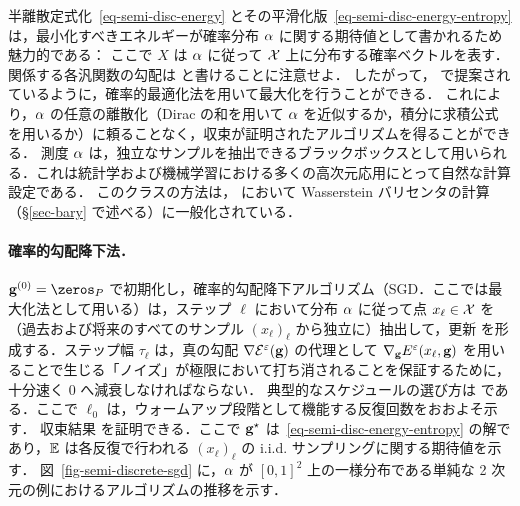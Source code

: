 半離散定式化~\eqref{eq-semi-disc-energy} とその平滑化版~\eqref{eq-semi-disc-energy-entropy} は，最小化すべきエネルギーが確率分布 $\alpha$ に関する期待値として書かれるため魅力的である：
ここで $X$ は $\alpha$ に従って $\mathcal{X}$ 上に分布する確率ベクトルを表す．
%
関係する各汎関数の勾配は
と書けることに注意せよ．
%
したがって，\citet{genevay2016stochastic} で提案されているように，確率的最適化法を用いて最大化を行うことができる．
%
これにより，$\alpha$ の任意の離散化（Dirac の和を用いて $\alpha$ を近似するか，積分に求積公式を用いるか）に頼ることなく，収束が証明されたアルゴリズムを得ることができる．
%
測度 $\alpha$ は，独立なサンプルを抽出できるブラックボックスとして用いられる．これは統計学および機械学習における多くの高次元応用にとって自然な計算設定である．
%
このクラスの方法は，\citep{staib2017parallel} において Wasserstein バリセンタの計算（\S\ref{sec-bary} で述べる）に一般化されている．

\paragraph{確率的勾配降下法．}

$\gD^{(0)} = \zeros_{P}$ で初期化し，確率的勾配降下アルゴリズム（SGD．ここでは最大化法として用いる）は，ステップ $\ell$ において分布 $\alpha$ に従って点 $x_\ell \in \mathcal{X}$ を（過去および将来のすべてのサンプル $(x_\ell)_\ell$ から独立に）抽出して，更新
を形成する．ステップ幅 $\tau_\ell$ は，真の勾配 $\nabla \mathcal{E}^\varepsilon(\mathrm{\textbf{g}})$ の代理として $\nabla_{\mathrm{\textbf{g}}} E^\varepsilon(x_\ell,\mathrm{\textbf{g}})$ を用いることで生じる「ノイズ」が極限において打ち消されることを保証するために，十分速く 0 へ減衰しなければならない．
%
典型的なスケジュールの選び方は
である．ここで $\ell_0$ は，ウォームアップ段階として機能する反復回数をおおよそ示す．
%
収束結果
を証明できる．ここで $\mathrm{\textbf{g}}^\star$ は~\eqref{eq-semi-disc-energy-entropy} の解であり，$\mathbb{E}$ は各反復で行われる $(x_\ell)_\ell$ の i.i.d. サンプリングに関する期待値を示す．
%
図~\ref{fig-semi-discrete-sgd} に，$\alpha$ が $[0,1]^2$ 上の一様分布である単純な 2 次元の例におけるアルゴリズムの推移を示す．


